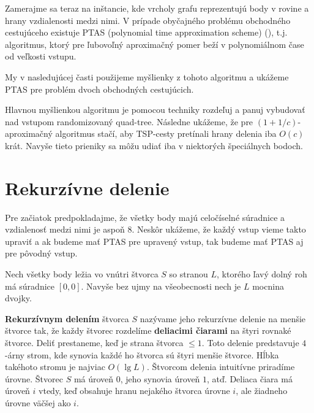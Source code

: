 Zamerajme sa teraz na inštancie, kde vrcholy grafu reprezentujú body v rovine a hrany
vzdialenosti medzi nimi. V prípade obyčajného problému obchodného cestujúceho
existuje PTAS (polynomial time approximation scheme) (\cite{Arora}), t.j. algoritmus, ktorý
pre ľubovoľný aproximačný pomer beží v polynomiálnom čase od veľkosti vstupu.

My v nasledujúcej časti použijeme myšlienky z tohoto algoritmu a ukážeme PTAS pre
problém dvoch obchodných cestujúcich.

Hlavnou myšlienkou algoritmu je pomocou techniky rozdeľuj a panuj vybudovať nad vstupom
randomizovaný quad-tree. Následne ukážeme, že pre $(1 + 1/c)$-aproximačný algoritmus stačí, aby
TSP-cesty pretínali hrany delenia iba $O(c)$ krát. Navyše tieto prieniky sa môžu
udiať iba v niektorých špeciálnych bodoch.

\section{Rekurzívne delenie}

%

Pre začiatok predpokladajme, že všetky body majú celočíselné súradnice a vzdialenosť
medzi nimi je aspoň $8$. Neskôr ukážeme, že každý vstup vieme takto upraviť a ak budeme mať PTAS
pre upravený vstup, tak budeme mať PTAS aj pre pôvodný vstup.

Nech všetky body ležia vo vnútri štvorca $S$ so stranou $L$, ktorého ľavý dolný roh
má súradnice $[0,0]$. Navyše bez ujmy na všeobecnosti nech je $L$ mocnina dvojky.

{\bf Rekurzívnym delením} štvorca $S$ nazývame jeho rekurzívne delenie na menšie štvorce tak, že
každy štvorec rozdelíme {\bf deliacimi čiarami} na štyri rovnaké štvorce.
Deliť prestaneme, keď je strana štvorca $\leq 1$. Toto delenie predstavuje
$4$-árny strom, kde synovia každé ho štvorca sú štyri menšie štvorce. Hĺbka takéhoto stromu je
najviac $O(\lg L)$. 
Štvorcom delenia intuitívne priradíme úrovne. Štvorec $S$ má úroveň $0$, jeho synovia úroveň $1$,
atď. Deliaca čiara má úroveň $i$ vtedy, keď obsahuje hranu nejakého štvorca úrovne $i$, ale žiadneho
úrovne väčšej ako $i$.

